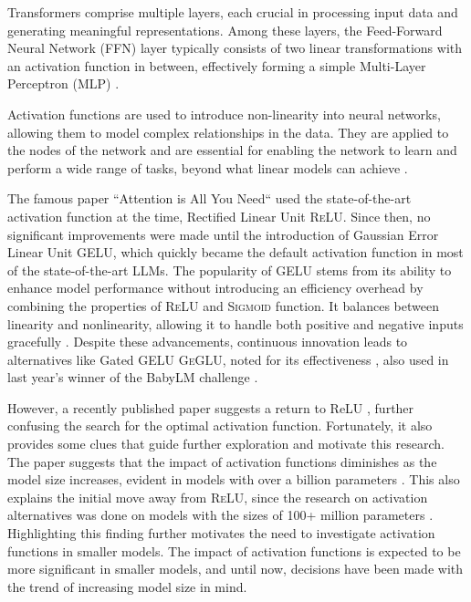 Transformers comprise multiple layers, each crucial in processing input data and generating meaningful representations. Among these layers, the Feed-Forward Neural Network (FFN) layer typically consists of two linear transformations with an activation function in between, effectively forming a simple Multi-Layer Perceptron (MLP) \cite{geva_transformer_2022}.

Activation functions are used to introduce non-linearity into neural networks, allowing them to model complex relationships in the data. They are applied to the nodes of the network and are essential for enabling the network to learn and perform a wide range of tasks, beyond what linear models can achieve \cite{dubey2022activation}.

The famous paper ``Attention is All You Need“ \cite{Vaswani2017} used the state-of-the-art activation function at the time, Rectified Linear Unit \textsc{ReLU}. Since then, no significant improvements were made until the introduction of Gaussian Error Linear Unit \textsc{GELU}, which quickly became the default activation function in most of the state-of-the-art LLMs. The popularity of GELU stems from its ability to enhance model performance without introducing an efficiency overhead by combining the properties of \textsc{ReLU} and \textsc{Sigmoid} function. It balances between linearity and nonlinearity, allowing it to handle both positive and negative inputs gracefully \cite{Hendrycks2023}. Despite these advancements, continuous innovation leads to alternatives like Gated GELU \textsc{GeGLU}, noted for its effectiveness \cite{Shazeer2020}, also used in last year's winner of the BabyLM challenge \cite{Samuel2023}. 

However, a recently published paper suggests a return to ReLU \cite{Mirzadeh2023}, further confusing the search for the optimal activation function. Fortunately, it also provides some clues that guide further exploration and motivate this research. The paper suggests that the impact of activation functions diminishes as the model size increases, evident in models with over a billion parameters \cite{Mirzadeh2023}. This also explains the initial move away from \textsc{ReLU}, since the research on activation alternatives was done on models with the sizes of 100+ million parameters \cite{Shazeer2020} \cite{Hendrycks2023}. Highlighting this finding further motivates the need to investigate activation functions in smaller models. The impact of activation functions is expected to be more significant in smaller models, and until now, decisions have been made with the trend of increasing model size in mind.


